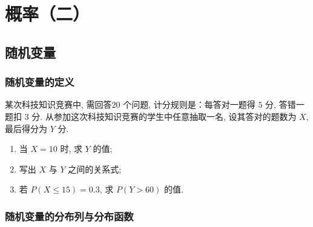 \chapter{概率（二）}
\section{随机变量}
\subsection{随机变量的定义}
\begin{definition}[随机变量]\label{def:随机变量}
    
\end{definition}
\begin{definition}[离散型随机变量]\label{def:离散型随机变量}
    
\end{definition}
\begin{example}
    某次科技知识竞赛中, 需回答$ 20$ 个问题, 计分规则是：每答对一题得 $5$ 分, 答错一题扣 $3$ 分.
    从参加这次科技知识竞赛的学生中任意抽取一名, 设其答对的题数为 $X$, 最后得分为 $Y$ 分.
    \begin{enumerate}
        \setlength{\itemsep}{-\itemsep}
        \item 当 $X=10$ 时, 求 $Y$ 的值; 
        \item 写出 $X$ 与 $Y$ 之间的关系式; 
        \item 若 $P(X \leq 15) = 0.3$, 求 $P(Y > 60)$ 的值.
    \end{enumerate}
\end{example}
\clearpage
\subsection{随机变量的分布列与分布函数}
\begin{definition}
    
\end{definition}
\clearpage

